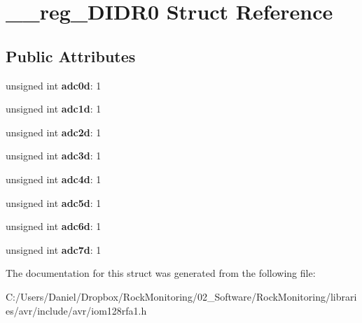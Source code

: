 \hypertarget{struct____reg___d_i_d_r0}{}\section{\+\_\+\+\_\+reg\+\_\+\+D\+I\+D\+R0 Struct Reference}
\label{struct____reg___d_i_d_r0}
\subsection*{Public Attributes}
\begin{DoxyCompactItemize}
\item 
unsigned int {\bfseries adc0d}\+: 1\hypertarget{struct____reg___d_i_d_r0_a2dc431f20ff57a481b2708793348e9cf}{}\label{struct____reg___d_i_d_r0_a2dc431f20ff57a481b2708793348e9cf}

\item 
unsigned int {\bfseries adc1d}\+: 1\hypertarget{struct____reg___d_i_d_r0_af9b091f7c3082d697a6365fd9e614ce6}{}\label{struct____reg___d_i_d_r0_af9b091f7c3082d697a6365fd9e614ce6}

\item 
unsigned int {\bfseries adc2d}\+: 1\hypertarget{struct____reg___d_i_d_r0_ad8651dccde154653bd4555414eef6888}{}\label{struct____reg___d_i_d_r0_ad8651dccde154653bd4555414eef6888}

\item 
unsigned int {\bfseries adc3d}\+: 1\hypertarget{struct____reg___d_i_d_r0_a82c8fabe9e209390d9983741b12773b4}{}\label{struct____reg___d_i_d_r0_a82c8fabe9e209390d9983741b12773b4}

\item 
unsigned int {\bfseries adc4d}\+: 1\hypertarget{struct____reg___d_i_d_r0_a4cea7d5b08c1eeea508c1f1295cb5055}{}\label{struct____reg___d_i_d_r0_a4cea7d5b08c1eeea508c1f1295cb5055}

\item 
unsigned int {\bfseries adc5d}\+: 1\hypertarget{struct____reg___d_i_d_r0_ac22c8ef9c4f53a04b0569b861d8e4c45}{}\label{struct____reg___d_i_d_r0_ac22c8ef9c4f53a04b0569b861d8e4c45}

\item 
unsigned int {\bfseries adc6d}\+: 1\hypertarget{struct____reg___d_i_d_r0_a60fbf3ccccc7f94e6924774833b1fead}{}\label{struct____reg___d_i_d_r0_a60fbf3ccccc7f94e6924774833b1fead}

\item 
unsigned int {\bfseries adc7d}\+: 1\hypertarget{struct____reg___d_i_d_r0_aecf07b8320b35bdfa294d83ab6f75846}{}\label{struct____reg___d_i_d_r0_aecf07b8320b35bdfa294d83ab6f75846}

\end{DoxyCompactItemize}


The documentation for this struct was generated from the following file\+:\begin{DoxyCompactItemize}
\item 
C\+:/\+Users/\+Daniel/\+Dropbox/\+Rock\+Monitoring/02\+\_\+\+Software/\+Rock\+Monitoring/libraries/avr/include/avr/iom128rfa1.\+h\end{DoxyCompactItemize}
